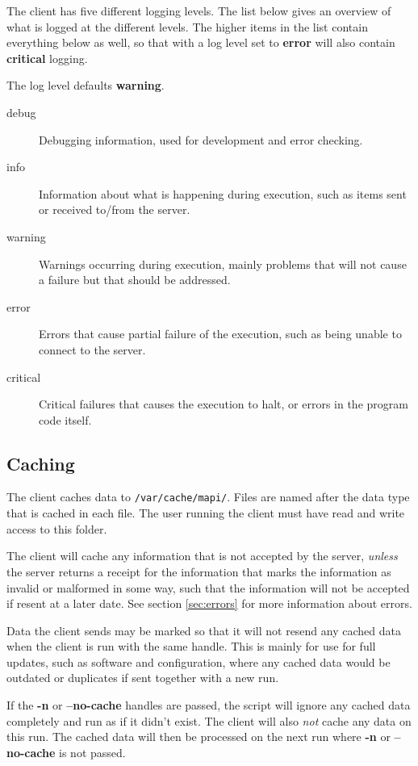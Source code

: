 The client has five different logging levels. The list below gives an overview
of what is logged at the different levels. The higher items in the list contain
everything below as well, so that with a log level set to \textbf{error} will
also contain \textbf{critical} logging.

The log level defaults \textbf{warning}. 

\begin{description}
    \item[debug]    Debugging information, used for development and error
    checking.
    \item[info] Information about what is happening during execution, such as
    items sent or received to/from the server.
    \item[warning]  Warnings occurring during execution, mainly problems that
    will not cause a failure but that should be addressed.
    \item[error]    Errors that cause partial failure of the execution, such as
    being unable to connect to the server.
    \item[critical] Critical failures that causes the execution to halt, or
    errors in the program code itself.
\end{description}

\subsection{Caching}
\label{sec:caching}
The client caches data to \texttt{/var/cache/mapi/}. Files are named after the
data type that is cached in each file. The user running the client must have
read and write access to this folder. 

The client will cache any information that is not accepted by the server, 
\textit{unless} the server returns a receipt for the information that marks the 
information as invalid or malformed in some way, such that the information will 
not be accepted if resent at a later date. See section \ref{sec:errors} for
more information about errors.

Data the client sends may be marked so that it will not resend any cached data
when the client is run with the same handle. This is mainly for use for full
updates, such as software and configuration, where any cached data would be
outdated or duplicates if sent together with a new run.

If the \textbf{-n} or \textbf{--no-cache} handles are passed, the script will
ignore any cached data completely and run as if it didn't exist. The client
will also \textit{not} cache any data on this run. The cached data will then be
processed on the next run where \textbf{-n} or \textbf{--no-cache} is not
passed. 
